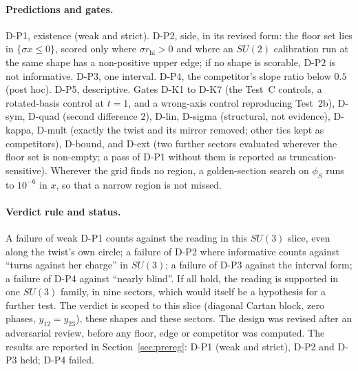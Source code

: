 \documentclass[11pt]{article}
\theoremstyle{definition}
\theoremstyle{remark}
\begin{document}
\paragraph{Predictions and gates.} D-P1, existence (weak and strict). D-P2, side, in its revised form: the floor set lies in
$\{\sigma x\le0\}$, scored only where $\sigma r_{\mathrm{hi}}>0$ and where an $SU(2)$ calibration run at the same shape has
a non-positive upper edge; if no shape is scorable, D-P2 is not informative. D-P3, one interval. D-P4, the competitor's
slope ratio below $0.5$ (post hoc). D-P5, descriptive. Gates D-K1 to D-K7 (the Test~C controls, a rotated-basis control
at $t=1$, and a wrong-axis control reproducing Test~2b), D-sym, D-quad (second difference $2$), D-lin, D-sigma (structural,
not evidence), D-kappa, D-mult (exactly the twist and its mirror removed; other ties kept as competitors), D-bound, and
D-ext (two further sectors evaluated wherever the floor set is non-empty; a pass of D-P1 without them is reported as
truncation-sensitive). Wherever the grid finds no region, a golden-section search on $\phi_S$ runs to $10^{-6}$ in $x$, so
that a narrow region is not missed.

\paragraph{Verdict rule and status.} A failure of weak D-P1 counts against the reading in this $SU(3)$ slice, even along
the twist's own circle; a failure of D-P2 where informative counts against ``turns against her charge'' in $SU(3)$; a
failure of D-P3 against the interval form; a failure of D-P4 against ``nearly blind''. If all hold, the reading is
supported in one $SU(3)$ family, in nine sectors, which would itself be a hypothesis for a further test. The verdict is
scoped to this slice (diagonal Cartan block, zero phases, $y_{12}=y_{23}$), these shapes and these sectors. The design was
revised after an adversarial review, before any floor, edge or competitor was computed. The results are reported in
Section~\ref{sec:prereg}: D-P1 (weak and strict), D-P2 and D-P3 held; D-P4 failed.
\end{document}
